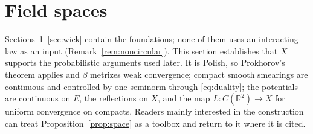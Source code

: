\documentclass[11pt]{article}
\theoremstyle{plain}
\theoremstyle{definition}
\theoremstyle{remark}
\newcommand{\R}{\mathbb{R}}
\begin{document}
\section{Field spaces}\label{sec:space}

Sections~\ref{sec:space}--\ref{sec:wick} contain the foundations; none of them uses an interacting law as an input (Remark~\ref{rem:noncircular}). This section establishes that $X$ supports the probabilistic arguments used later. It is Polish, so Prokhorov's theorem applies and $\beta$ metrizes weak convergence; compact smooth smearings are continuous and controlled by one seminorm through \eqref{eq:duality}; the potentials are continuous on $E$, the reflections on $X$, and the map $L:C(\R^{2})\to X$ for uniform convergence on compacts. Readers mainly interested in the construction can treat Proposition~\ref{prop:space} as a toolbox and return to it where it is cited.
\end{document}
